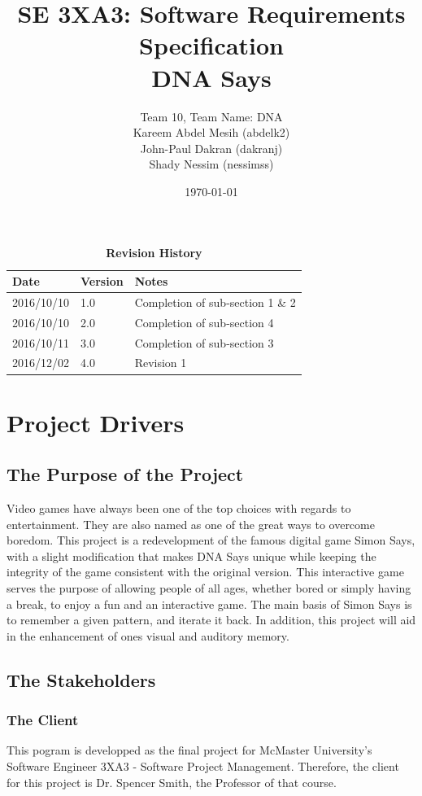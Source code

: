 \documentclass[12pt, titlepage]{article}
\title{SE 3XA3: Software Requirements Specification\\DNA Says}
\author{Team 10, Team Name: DNA
		\\ Kareem Abdel Mesih (abdelk2)
		\\ John-Paul Dakran (dakranj)
		\\ Shady Nessim (nessimss)
}
\date{\today}
\begin{document}
\maketitle

\tableofcontents
\listoftables
\listoffigures

\begin{table}[bp]
\caption{\bf Revision History}
\begin{tabularx}{\textwidth}{p{3cm}p{2cm}X}
\toprule {\bf Date} & {\bf Version} & {\bf Notes}\\
\midrule
2016/10/10 & 1.0 & Completion of sub-section 1 \& 2\\
2016/10/10 & 2.0 & Completion of sub-section 4 \\
2016/10/11 & 3.0 & Completion of sub-section 3 \\
2016/12/02 & 4.0 & Revision 1 \\
\bottomrule
\end{tabularx}
\end{table}

\newpage


\section{Project Drivers}

\subsection{The Purpose of the Project}
Video games have always been one of the top choices with regards to entertainment. They are also named as one of the great ways to overcome boredom. This project is a redevelopment of the famous digital game Simon Says, with a slight modification that makes DNA Says unique while keeping the integrity of the game consistent with the original version. This interactive game serves the purpose of allowing people of all ages, whether bored or simply having a break, to enjoy a fun and an interactive game. The main basis of Simon Says is to remember a given pattern, and iterate it back. In addition, this project will aid in the enhancement of ones visual and auditory memory.
\subsection{The Stakeholders}

\subsubsection{The Client}
This pogram is developped as the final project for McMaster University's Software Engineer 3XA3 - Software Project Management. Therefore, the client for this project is Dr. Spencer Smith, the  Professor of  that course.
\end{document}
